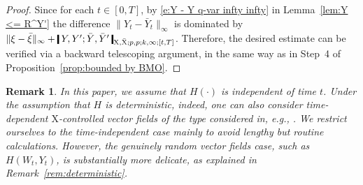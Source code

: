 \documentclass[11pt,reqno]{amsart}
\newtheorem{remark}[lemma]{Remark}
\numberwithin{equation}{section}
\newcommand{\shortthickbar}{%
  \vcenter{\hbox{\rule{1.8pt}{2.2ex}}}%
}
\newcommand{\thicknm}[1]{%
  \mathopen{\shortthickbar}%
  \mkern4mu #1 \mkern4mu%
  \mathclose{\shortthickbar}%
}
\begin{document}
\begin{proof}
Since for each $t \in [0,T]$, by \eqref{e:Y - Y q-var infty infty} in Lemma~\ref{lem:Y <= R^Y'} the difference $\|Y_t - \bar Y_t\|_{\infty}$ is dominated by $\|\xi - \bar \xi\|_{\infty} +\thicknm{Y ,Y'; \bar Y, \bar Y'}_{\mathrm X,\bar{\mathrm X};p,p;k,\infty;[t,T]}$. Therefore, the desired estimate can be verified via a backward telescoping argument, in the same way as in Step~4 of Proposition~\ref{prop:bounded by BMO}.  
\end{proof}

\begin{remark}\label{rem:on controlled fields}
In this paper, we assume that $H(\bm\cdot)$ is independent of time $t$. Under the assumption that $H$ is deterministic, indeed, one can also consider time-dependent $\mathrm X$-controlled vector fields of the type considered in, e.g., \cite{nx20,dause2026controlled}. 
We restrict ourselves to the time-independent case mainly to avoid lengthy but routine calculations.
However, the genuinely random vector fields case, such as $H(W_t,Y_t)$, is substantially more delicate, as explained in Remark~\ref{rem:deterministic}.
\end{remark} 
\end{document}
